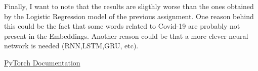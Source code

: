 \documentclass{article}
\begin{document}
Finally, I want to note that the results are sligthly worse than the ones obtained by the Logistic Regression model of the previous assignment. One reason behind this could be the fact that some words related to Covid-19 are probably not present in the Embeddings. Another reason could be that a more clever neural network is needed (RNN,LSTM,GRU, etc).

\begin{thebibliography}{9}
\bibitem{}
\href{https://pytorch.org/docs/stable/nn.html#non-linear-activations-other}{PyTorch Documentation}

\end{thebibliography}
\end{document}
